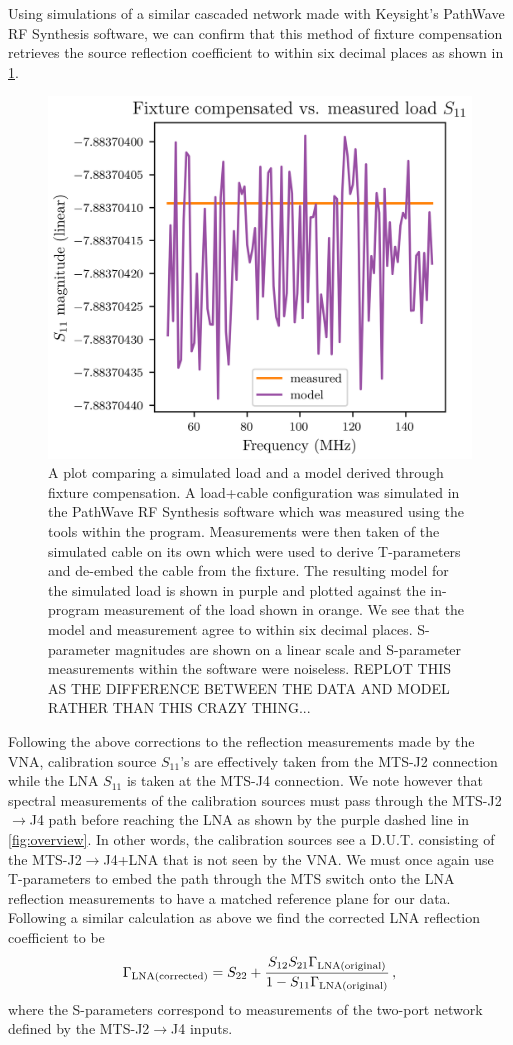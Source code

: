 Using simulations of a similar cascaded network made with Keysight’s PathWave RF Synthesis software, we can confirm that this method of fixture compensation retrieves the source reflection coefficient to within six decimal places as shown in \cref{fig:tparam}.
\begin{figure}
    \centering
    \includegraphics[width=.7\textwidth]{tparam}
    \caption{A plot comparing a simulated load and a model derived through fixture compensation. A load+cable configuration was simulated in the PathWave RF Synthesis software which was measured using the tools within the program. Measurements were then taken of the simulated cable on its own which were used to derive T-parameters and de-embed the cable from the fixture. The resulting model for the simulated load is shown in purple and plotted against the in-program measurement of the load shown in orange. We see that the model and measurement agree to within six decimal places. S-parameter magnitudes are shown on a linear scale and S-parameter measurements within the software were noiseless. REPLOT THIS AS THE DIFFERENCE BETWEEN THE DATA AND MODEL RATHER THAN THIS CRAZY THING...}
    \label{fig:tparam}
\end{figure}

Following the above corrections to the reflection measurements made by the VNA, calibration source $S_{11}$’s are effectively taken from the MTS-J2 connection while the LNA $S_{11}$ is taken at the MTS-J4 connection. We note however that spectral measurements of the calibration sources must pass through the MTS-J2$\rightarrow$J4 path before reaching the LNA as shown by the purple dashed line in \cref{fig:overview}. In other words, the calibration sources see a D.U.T. consisting of the MTS-J2$\rightarrow$J4+LNA that is not seen by the VNA. We must once again use T-parameters to embed the path through the MTS switch onto the LNA reflection measurements to have a matched reference plane for our data. Following a similar calculation as above we find the corrected LNA reflection coefficient to be
\begin{equation}
    \Gamma_{\mathrm{\mathrm{LNA (corrected)}}} = S_{22} + \frac{S_{12}S_{21}\Gamma_{\mathrm{\mathrm{LNA (original)}}}}{1 - S_{11}\Gamma_{\mathrm{\mathrm{LNA (original)}}}} \,,
\end{equation}
where the S-parameters correspond to measurements of the two-port network defined by the MTS-J2$\rightarrow$J4 inputs.

